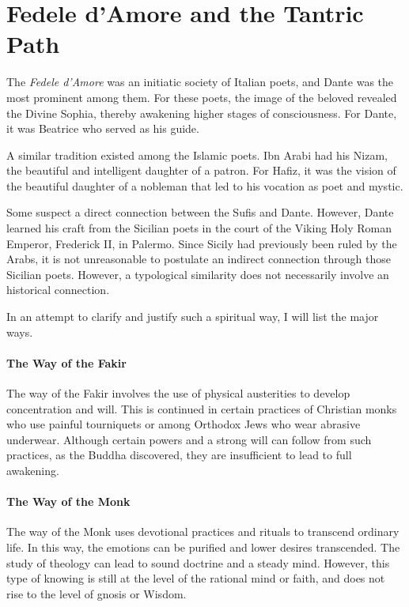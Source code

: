 \section{Fedele d'Amore and the Tantric Path}

The \emph{Fedele d'Amore} was an initiatic society of Italian poets, and Dante was the most prominent among them. For these poets, the image of the beloved revealed the Divine Sophia, thereby awakening higher stages of consciousness. For Dante, it was Beatrice who served as his guide. 

A similar tradition existed among the Islamic poets. Ibn Arabi had his Nizam, the beautiful and intelligent daughter of a patron. For Hafiz, it was the vision of the beautiful daughter of a nobleman that led to his vocation as poet and mystic. 

Some suspect a direct connection between the Sufis and Dante. However, Dante learned his craft from the Sicilian poets in the court of the Viking Holy Roman Emperor, Frederick II, in Palermo. Since Sicily had previously been ruled by the Arabs, it is not unreasonable to postulate an indirect connection through those Sicilian poets. However, a typological similarity does not necessarily involve an historical connection. 

In an attempt to clarify and justify such a spiritual way, I will list the major ways. 

\paragraph{The Way of the Fakir}
The way of the Fakir involves the use of physical austerities to develop concentration and will. This is continued in certain practices of Christian monks who use painful tourniquets or among Orthodox Jews who wear abrasive underwear. Although certain powers and a strong will can follow from such practices, as the Buddha discovered, they are insufficient to lead to full awakening. 

\paragraph{The Way of the Monk}
The way of the Monk uses devotional practices and rituals to transcend ordinary life. In this way, the emotions can be purified and lower desires transcended. The study of theology can lead to sound doctrine and a steady mind. However, this type of knowing is still at the level of the rational mind or faith, and does not rise to the level of gnosis or Wisdom. 

